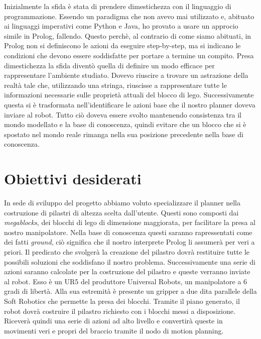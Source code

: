Inizialmente la sfida è stata di prendere dimestichezza con il linguaggio di programmazione.
Essendo un paradigma che non avevo mai utilizzato e, abituato ai linguaggi imperativi come Python e Java, ho provato a usare un approcio simile
in Prolog, fallendo. Questo perchè, al contrario di come siamo abituati, in Prolog non si definiscono le azioni da eseguire step-by-step, ma si indicano le condizioni che devono essere soddisfatte per portare a termine un compito.
Presa dimestichezza la sfida diventò quella di definire un modo efficace per rappresentare l'ambiente studiato.
Dovevo riuscire a trovare un astrazione della realtà tale che, utilizzando una stringa, riuscisse a rappresentare tutte le informazioni necessarie sulle proprietà
attuali del blocco di lego. Successivamente questa si è trasformata nell'identificare le azioni base che il nostro planner doveva inviare al robot.
Tutto ciò doveva essere svolto mantenendo consistenza tra il mondo modellato e la base di conoscenza, quindi evitare che un blocco che si è spostato
nel mondo reale rimanga nella sua posizione precedente nella base di conoscenza. 

\section{Obiettivi desiderati}
\label{sec:obiettdes}
In sede di sviluppo del progetto abbiamo voluto specializzare il planner nella costruzione di pilastri di altezza scelta dall'utente. Questi sono 
composti dai \textit{megablocks}, dei blocchi di lego di dimensione maggiorata, per facilitare la presa al nostro manipolatore. Nella base di conoscenza questi saranno rapressentati come dei fatti \textit{ground}, ciò significa che il nostro 
interprete Prolog li assumerà per veri a priori. Il predicato che svolgerà la creazione del pilastro dovrà restituire tutte le possibili soluzioni che
soddisfano il nostro problema. Successivamente una serie di azioni saranno calcolate per la costruzione del pilastro e queste verranno inviate al robot. Esso è un UR5
del produttore Universal Robots, un manipolatore a 6 gradi di libertà. Alla sua estremità è presente un gripper a due dita parallele della Soft Robotics che permette la presa dei blocchi.
Tramite il piano generato, il robot dovrà costruire il pilastro richiesto con i blocchi messi a disposizione. Riceverà quindi una serie di azioni ad alto
livello e convertirà queste in movimenti veri e propri del braccio tramite il nodo di motion planning.

